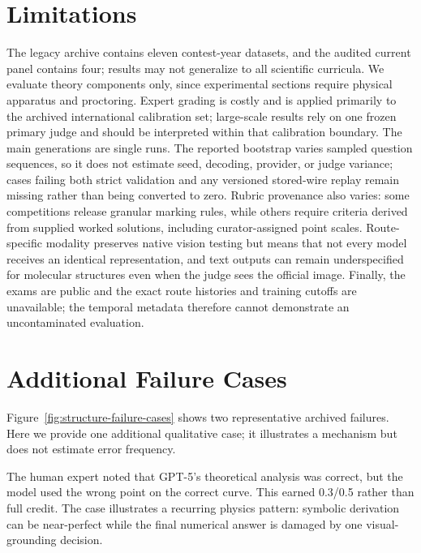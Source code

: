 \documentclass[11pt]{article}
\begin{document}
\section*{Limitations}
The legacy archive contains eleven contest-year datasets, and the audited current panel contains four; results may not generalize to all scientific curricula.
We evaluate theory components only, since experimental sections require physical apparatus and proctoring.
Expert grading is costly and is applied primarily to the archived international calibration set; large-scale results rely on one frozen primary judge and should be interpreted within that calibration boundary.
The main generations are single runs. The reported bootstrap varies sampled question sequences, so it does not estimate seed, decoding, provider, or judge variance; cases failing both strict validation and any versioned stored-wire replay remain missing rather than being converted to zero.
Rubric provenance also varies: some competitions release granular marking rules, while others require criteria derived from supplied worked solutions, including curator-assigned point scales.
Route-specific modality preserves native vision testing but means that not every model receives an identical representation, and text outputs can remain underspecified for molecular structures even when the judge sees the official image.
Finally, the exams are public and the exact route histories and training cutoffs are unavailable; the temporal metadata therefore cannot demonstrate an uncontaminated evaluation.





\appendix

\section{Additional Failure Cases}
\label{app:additional_cases}
Figure~\ref{fig:structure-failure-cases} shows two representative archived failures.
Here we provide one additional qualitative case; it illustrates a mechanism but does not estimate error frequency.

\begin{tcolorbox}[
  title={Physics: correct theory, wrong graph binding (IPhO 2025 S1 B2)},
  colback=gray!3,
  colframe=black!35,
  boxrule=0.6pt,
  arc=1.5mm,
  left=1.5mm,right=1.5mm,top=1mm,bottom=1mm
]
\footnotesize
The human expert noted that GPT-5's theoretical analysis was correct, but the model used the wrong point on the correct curve.
This earned 0.3/0.5 rather than full credit.
The case illustrates a recurring physics pattern: symbolic derivation can be near-perfect while the final numerical answer is damaged by one visual-grounding decision.
\end{tcolorbox}
\end{document}
